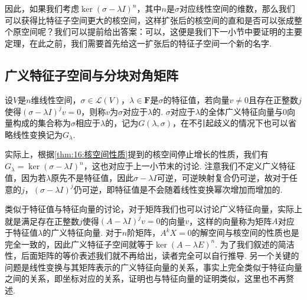 因此，如果我们考虑$\ker(\sigma-\lambda I)^n$，其中$n$是$\sigma$对应线性空间的维数，那么我们可以获得比特征子空间更大的核空间，这样扩张后的核空间的直和是否可以张成整个原空间呢？我们可以提前给出答案：可以，这便是我们下一小节中要证明的主要定理，在此之前，我们需要首先给这一扩张后的特征子空间一个新的名字.

\subsection{广义特征子空间与分块对角矩阵}

\begin{definition}
    设$V$是$n$维线性空间，$\sigma\in \mathcal{L}(V)$，$\lambda\in\mathbf{F}$是$\sigma$的特征值，若向量$v\neq 0$且存在正整数$j$使得$(\sigma-\lambda I)^jv=0$，则称$v$为$\sigma$对应于$\lambda$的. $\sigma$对应于$\lambda$的全体广义特征向量与0向量构成的集合称为$\sigma$相应于$\lambda$的，记为$G(\lambda,\sigma)$，在不引起歧义的情况下也可以省略线性变换记为$G_\lambda$.
\end{definition}

实际上，根据\autoref{thm:16:核空间性质}提到的核空间停止增长的性质，我们有$G_\lambda=\ker (\sigma-\lambda I)^n$，这也对应于上一小节末的讨论. 注意我们不定义广义特征值，因为若$\lambda$原先不是特征值，因此$\sigma-\lambda I$可逆，可逆映射复合仍可逆，故对于任意的$j$，$(\sigma-\lambda I)^j$仍可逆，即特征值是不会随着线性变换幂次增加而增加的.

类似于特征值与特征向量的讨论，对于矩阵我们也可以讨论广义特征向量，实际上就是满足存在正整数$j$使得$(A-\lambda I)^jv=0$的向量$v$，这样的向量称为矩阵$A$对应于特征值$\lambda$的广义特征向量. 对于$n$阶矩阵，$A^kX=0$的解空间与核空间的性质也是完全一致的，因此广义特征子空间就等于$\ker(A-\lambda E)^n$. 为了我们叙述的简洁性，后面矩阵的等价表述我们就不再给出，读者完全可以自行推导. 另一个关键的问题是线性变换与其矩阵表示的广义特征向量的关系，事实上完全类似于特征向量之间的关系，即坐标对应的关系，证明也与特征向量的证明类似，这里也不再赘述.

